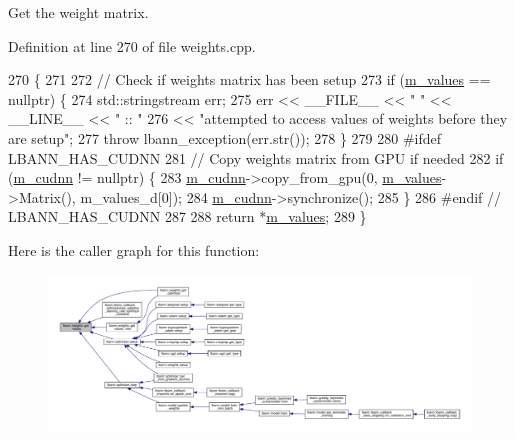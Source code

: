 Get the weight matrix. 

Definition at line 270 of file weights.\+cpp.


\begin{DoxyCode}
270                                       \{
271 
272   \textcolor{comment}{// Check if weights matrix has been setup}
273   \textcolor{keywordflow}{if} (\hyperlink{classlbann_1_1weights_a6b2df671b6d4c4dd595477971eea0543}{m\_values} == \textcolor{keyword}{nullptr}) \{
274     std::stringstream err;
275     err << \_\_FILE\_\_ << \textcolor{stringliteral}{" "} << \_\_LINE\_\_ << \textcolor{stringliteral}{" :: "}
276         << \textcolor{stringliteral}{"attempted to access values of weights before they are setup"};
277     \textcolor{keywordflow}{throw} lbann\_exception(err.str());
278   \}
279 
280 \textcolor{preprocessor}{  #ifdef LBANN\_HAS\_CUDNN}
281   \textcolor{comment}{// Copy weights matrix from GPU if needed}
282   \textcolor{keywordflow}{if} (\hyperlink{classlbann_1_1weights_a873e8c14998915e442d03b8dd7d2fdf7}{m\_cudnn} != \textcolor{keyword}{nullptr}) \{
283     \hyperlink{classlbann_1_1weights_a873e8c14998915e442d03b8dd7d2fdf7}{m\_cudnn}->copy\_from\_gpu(0, \hyperlink{classlbann_1_1weights_a6b2df671b6d4c4dd595477971eea0543}{m\_values}->Matrix(), m\_values\_d[0]);
284     \hyperlink{classlbann_1_1weights_a873e8c14998915e442d03b8dd7d2fdf7}{m\_cudnn}->synchronize();
285   \}
286 \textcolor{preprocessor}{  #endif // LBANN\_HAS\_CUDNN}
287 
288   \textcolor{keywordflow}{return} *\hyperlink{classlbann_1_1weights_a6b2df671b6d4c4dd595477971eea0543}{m\_values};
289 \}
\end{DoxyCode}
Here is the caller graph for this function\+:\nopagebreak
\begin{figure}[H]
\begin{center}
\leavevmode
\includegraphics[width=350pt]{classlbann_1_1weights_a09fa4082be905c0c124dde3033e2461b_icgraph}
\end{center}
\end{figure}
\mbox{\label{classlbann_1_1weights_a506b6445c46a92cdadad75caf1c166d3}} 
